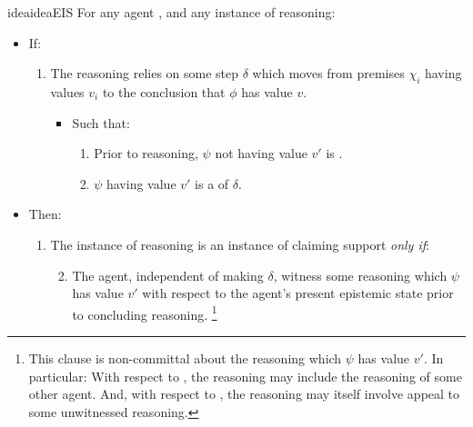 \begin{note}
  \begin{restatable}{idea}{ideaEIS}
    \label{idea:CS:B}
    For any agent \vAgent{}, and any instance of reasoning:
    \begin{itemize}[leftmargin=*]
    \item
      If:
      \begin{enumerate}[label=\arabic*., ref=(\arabic*)]
      \item
        \label{idea:CS:B:step}
        The reasoning relies on some step \(\delta\) which moves from premises \(\chi_{i}\) having values \(v_{i}\) to the conclusion that \(\phi\) has value \(v\).
        \begin{itemize}
        \item
          Such that:
          \begin{enumerate}[label=\alph*., ref=(\alph*)]
          \item
            \label{idea:CS:B:step:epV-requ}
            Prior to reasoning, \(\psi\) not having value \(v'\) is \epVAd{}.
          \item
            \label{idea:CS:B:step:requ}
            \(\psi\) having value \(v'\) is a \emph{\requ{}} of \(\delta\).
          \end{enumerate}
        \end{itemize}
      \end{enumerate}
    \item
      Then:
      \begin{enumerate}[label=\arabic*., ref=(\arabic*), resume]
      \item
        The instance of reasoning is an instance of claiming support \emph{only if}:
        \begin{enumerate}[label=\alph*., ref=(\alph*)]
          \setcounter{enumii}{1}
        \item
          \label{idea:CS:B:prior-reasoning}
          The agent, independent of making \(\delta\), witness some reasoning which  \(\psi\) has value \(v'\) with respect to the agent's present epistemic state prior to concluding reasoning.\nolinebreak
          \footnote{
            This clause is non-committal about the reasoning which  \(\psi\) has value \(v'\).
            In particular:
            With respect to \ESU{}, the reasoning may include the reasoning of some other agent.
            And, with respect to \EAS{}, the reasoning may itself involve appeal to some unwitnessed reasoning.
          }
        \end{enumerate}
      \end{enumerate}
    \end{itemize}
    \vspace{-\baselineskip}
  \end{restatable}
\end{note}

